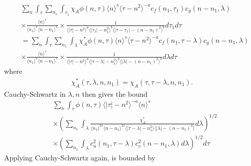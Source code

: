 \documentclass[12pt,reqno]{amsart}
\numberwithin{equation}{section}  %
\renewcommand{\cref}{\Cref}
\begin{document}
\begin{equation*}
	\begin{split}
    & \sum_{n} \int_{\tau}   \sum_{n_{1}}
    \int_{\tau_{1}} \chi_{A}
    \phi(n, \tau) \langle n \rangle^s \langle \tau - n^{2} \rangle^{-a}
  c_f(n_1, \tau_1)
		c_g(n - n_1, \lambda )
		\\
    & \times \frac{\langle n \rangle ^{s}}{\langle n_{1} \rangle ^{s} \langle
    n-n_{1} \rangle ^{s}} \times \frac{1}{\langle |\tau| - n^{2} \rangle
    ^{a}\langle |\tau_{1}|-n_{1}^{2} \rangle ^{b}\langle | \tau -
    \tau_{1}|-(n - n_{1})^{2}
    \rangle ^{b}} d \tau_1 d \tau
    \\
    & = \sum_{n} \int_{\tau}   \sum_{n_{1}}
    \int_{\lambda} \chi^{*}_{A}
    \phi(n, \tau) \langle n \rangle^s \langle \tau - n^{2} \rangle^{-a}
  c_f(n_1, \tau - \lambda)
		c_g(n - n_1, \lambda )
		\\
    & \times \frac{\langle n \rangle ^{s}}{\langle n_{1} \rangle ^{s} \langle
    n-n_{1} \rangle ^{s}} \times \frac{1}{\langle |\tau| - n^{2} \rangle
    ^{a}\langle |\tau - \lambda|-n_{1}^{2} \rangle ^{b}\langle |
    \lambda|-(n - n_{1})^{2}
    \rangle ^{b}} d \lambda  d \tau
	\end{split}
\end{equation*}
where 
%
%
\begin{equation}
  \label{change-of-var}
\begin{split}
  \chi^{*}_{A}(\tau, \lambda, n, n_{1}) =
  \chi_{A}(\tau, \tau - \lambda, n, n_{1}).
\end{split}
\end{equation}
%
%
Cauchy-Schwartz in
$\lambda, n$ then gives the bound
%
%
%
\begin{equation}
	\label{10g*}
	\begin{split}
    & \sum_{n} \int_{\tau} \phi(n, \tau) \langle | \tau | - n^{2} \rangle
    ^{-a} \langle n \rangle ^{s}
    \\
    & \times \left( \sum_{n_{1}} \int_{\lambda}
    \frac{\chi^{*}_{A}}{\langle n_{1} \rangle ^{2s} \langle n-n_{1} \rangle ^{2s} \langle |
    \tau - \lambda | - n_{1}^{2}\rangle  \langle | \lambda | -
    (n - n_{1})^{2} \rangle } d \lambda \right)^{1/2}
    \\
    & \times \left( \sum_{n_{1}} \int_{\lambda} c_{u}^{2}(n_{1}, \tau - \lambda)
    c_{v}^{2}(n - n_{1}, \lambda) d \lambda \right)^{1/2} d \tau
  \end{split}
\end{equation}
%
%
Applying Cauchy-Schwartz again, \cref{10g*} is bounded by
\end{document}

